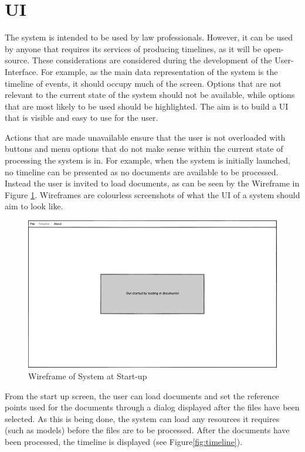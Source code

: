 \section{UI}
\par The system is intended to be used by law professionals. However, it can be used by anyone that requires its services of producing timelines, as it will be open-source.  These considerations are considered during the development of the User-Interface. For example, as the main data representation of the system is the timeline of events, it should occupy much of the screen. Options that are not relevant to the current state of the system should not be available, while options that are most likely to be used should be highlighted. The aim is to build a UI that is visible and easy to use for the user.
\par Actions that are made unavailable ensure that the user is not overloaded with buttons and menu options that do not make sense within the current state of processing the system is in. For example, when the system is initially launched, no timeline can be presented as no documents are available to be processed. Instead the user is invited to load documents, as can be seen by the Wireframe in Figure \ref{fig:startup}. Wireframes are colourless screenshots of what the UI of a system should aim to look like.
\begin{figure}[H]
\caption{Wireframe of System at Start-up}
\label{fig:startup}
\includegraphics[width=\linewidth]{startup.png}
\centering
\end{figure}
\par From the start up screen, the user can load documents and set the reference points used for the documents through a dialog displayed after the files have been selected. As this is being done, the system can load any resources it requires (such as models) before the files are to be processed. After the documents have been processed, the timeline is displayed (see Figure\ref{fig:timeline}).
